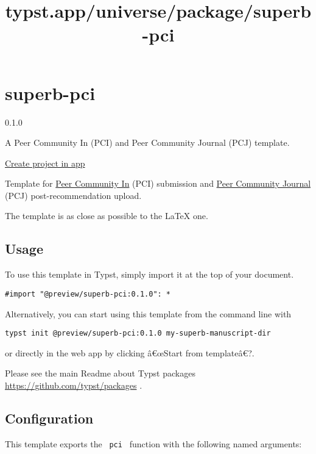 \title{typst.app/universe/package/superb-pci}

\label{banner}
\label{template-thumbnail}

\section{superb-pci}\label{superb-pci}

{ 0.1.0 }

A Peer Community In (PCI) and Peer Community Journal (PCJ) template.

\href{/app?template=superb-pci&version=0.1.0}{Create project in app}

\label{readme}
Template for \href{https://peercommunityin.org/}{Peer Community In}
(PCI) submission and \href{https://peercommunityjournal.org/}{Peer
Community Journal} (PCJ) post-recommendation upload.

The template is as close as possible to the LaTeX one.

\subsection{Usage}\label{usage}

To use this template in Typst, simply import it at the top of your
document.

\begin{verbatim}
#import "@preview/superb-pci:0.1.0": *
\end{verbatim}

Alternatively, you can start using this template from the command line
with

\begin{verbatim}
typst init @preview/superb-pci:0.1.0 my-superb-manuscript-dir
\end{verbatim}

or directly in the web app by clicking â€œStart from templateâ€?.

Please see the main Readme about Typst packages
\url{https://github.com/typst/packages} .

\subsection{Configuration}\label{configuration}

This template exports the \texttt{\ pci\ } function with the following
named arguments:

